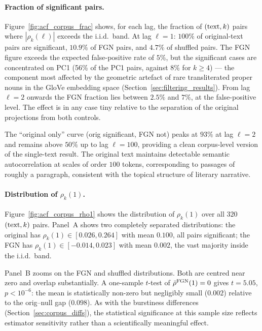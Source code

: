 \documentclass[12pt,a4paper]{article}
\begin{document}
\paragraph{Fraction of significant pairs.}
Figure~\ref{fig:acf_corpus_frac} shows, for each lag, the fraction of
$({\rm text}, k)$ pairs where $|\rho_k(\ell)|$ exceeds the i.i.d.\
band.
At lag $\ell = 1$: $100\%$ of original-text pairs are significant,
$10.9\%$ of FGN pairs, and $4.7\%$ of shuffled pairs.
The FGN figure exceeds the expected false-positive rate
of $5\%$, but the significant cases are concentrated on PC1
(56\% of the PC1 pairs, against 8\% for $k \geq 4$) --- the component
most affected by the geometric artefact of rare transliterated proper
nouns in the GloVe embedding space (Section~\ref{sec:filtering_results}).
From lag $\ell = 2$ onwards the FGN fraction lies between $2.5\%$ and
$7\%$, at the false-positive level. The effect is in any case tiny
relative to the separation of the original projections from both
controls.

The ``original only'' curve (orig significant, FGN not) peaks at
$93\%$ at lag $\ell = 2$ and remains above $50\%$ up to lag
$\ell = 100$, providing a clean corpus-level version of the
single-text result.
The original text maintains detectable semantic autocorrelation
at scales of order $100$ tokens, corresponding to passages of
roughly a paragraph, consistent with the topical structure of
literary narrative.

\paragraph{Distribution of $\rho_k(1)$.}
Figure~\ref{fig:acf_corpus_rho1} shows the distribution of
$\rho_k(1)$ over all $320$ $({\rm text}, k)$ pairs.
Panel~A shows two completely separated distributions: the original
has $\rho_k(1) \in [0.026, 0.264]$ with mean $0.100$, all
pairs significant; the FGN has $\rho_k(1) \in [-0.014, 0.023]$
with mean $0.002$, the vast majority inside the i.i.d.\ band.

Panel~B zooms on the FGN and shuffled distributions.
Both are centred near zero and overlap substantially.
A one-sample $t$-test of $\bar\rho^{\rm FGN}(1) = 0$ gives
$t = 5.05$, $p < 10^{-6}$: the mean is statistically non-zero but
negligibly small ($0.002$) relative to the orig--null gap ($0.098$).
As with the burstiness differences (Section~\ref{sec:corpus_diffs}),
the statistical significance at this sample size reflects estimator
sensitivity rather than a scientifically meaningful effect.
\end{document}
